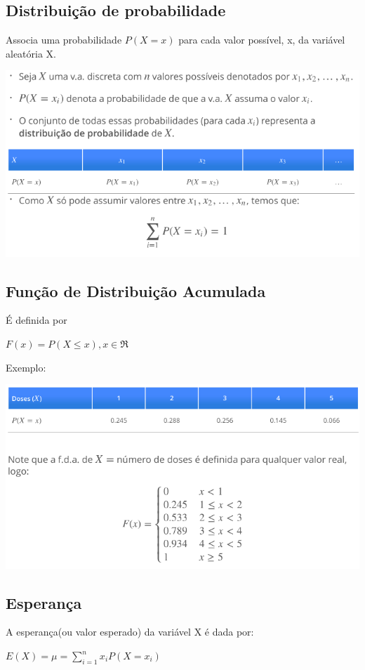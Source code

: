 \documentclass[a4paper, 12pt]{article}
\begin{document}
\subsection{Distribuição de probabilidade}
	Associa uma probabilidade $P(X = x)$ para cada valor possível, x, da variável aleatória X.
	\begin{center}
		\includegraphics[width=0.8\linewidth]{imagens/vardis3}
	\end{center}

\subsection{Função de Distribuição Acumulada}
	É definida por
	\begin{center}
		\LARGE
		$F(x) = P(X \leq x), x \in \Re $
	\end{center}
	Exemplo:
	\begin{center}
		\includegraphics[width=0.8\linewidth]{imagens/vardis2}
	\end{center}

\subsection{Esperança}
	A esperança(ou valor esperado) da variável X é dada por:
	\begin{center}
		$E(X) = \mu = \sum_{i = 1}^{n} x_{i}P(X = x_{i})$
	\end{center}
\end{document}
